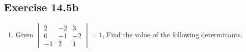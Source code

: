 \documentclass{report}
\begin{document}
\begin{multicols}{2}
    \subsection{Exercise 14.5b}

    \begin{enumerate}

        \item Given $\begin{vmatrix}
                      2  & -2 & 3  \\
                      0  & -1 & -2 \\
                      -1 & 2  & 1
                  \end{vmatrix} = 1$, Find the value of the following determinants.


\end{enumerate}
\end{multicols}
\end{document}
